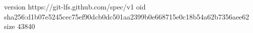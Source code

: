 version https://git-lfs.github.com/spec/v1
oid sha256:d1b07e5245cec75ef90dcb0dc501aa2399b0e668715e0c18b54a62b7356aee62
size 43840
